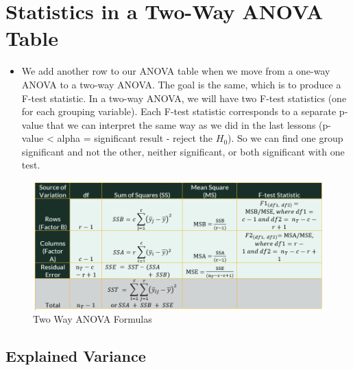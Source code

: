 \documentclass[
  letterpaper,
  DIV=11,
  numbers=noendperiod]{scrreprt}
\providecommand{\tightlist}{%
  \setlength{\itemsep}{0pt}\setlength{\parskip}{0pt}}\usepackage{longtable,booktabs,array}
\begin{document}
\section{Statistics in a Two-Way ANOVA
Table}\label{statistics-in-a-two-way-anova-table}

\begin{itemize}
\tightlist
\item
  We add another row to our ANOVA table when we move from a one-way
  ANOVA to a two-way ANOVA. The goal is the same, which is to produce a
  F-test statistic. In a two-way ANOVA, we will have two F-test
  statistics (one for each grouping variable). Each F-test statistic
  corresponds to a separate p-value that we can interpret the same way
  as we did in the last lessons (p-value \textless{} alpha = significant
  result - reject the \(H_0\)). So we can find one group significant and
  not the other, neither significant, or both significant with one test.
\end{itemize}

\begin{figure}[H]

{\centering \includegraphics{Pictures/Ch7/2WayANOVA.PNG}

}

\caption{Two Way ANOVA Formulas}

\end{figure}%

\subsection{Explained Variance}\label{explained-variance-1}
\end{document}
